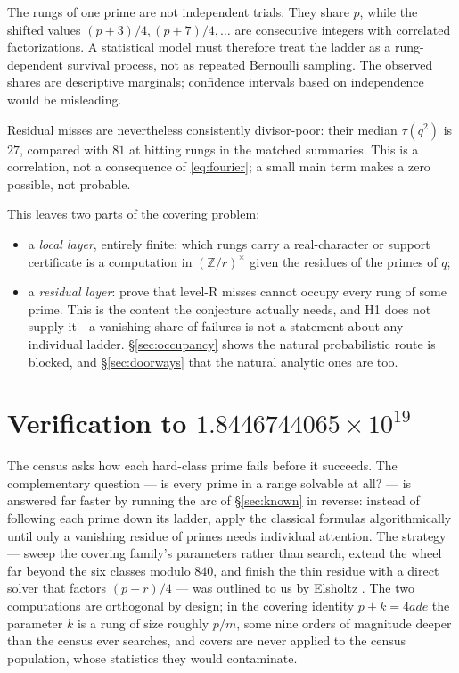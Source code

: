 \documentclass[11pt]{article}
\theoremstyle{definition}
\theoremstyle{remark}
\begin{document}
The rungs of one prime are not independent trials. They share $p$, while the shifted
values $(p+3)/4,(p+7)/4,\ldots$ are consecutive integers with correlated
factorizations. A statistical model must therefore treat the ladder as a
rung-dependent survival process, not as repeated Bernoulli sampling. The observed
shares are descriptive marginals; confidence intervals based on independence would be
misleading.

Residual misses are nevertheless consistently divisor-poor: their median
$\tau(q^2)$ is $27$, compared with $81$ at hitting rungs in the matched summaries. This
is a correlation, not a consequence of \eqref{eq:fourier}; a small main term makes a
zero possible, not probable.

This leaves two parts of the covering problem:

\begin{itemize}
\item a \emph{local layer}, entirely finite: which rungs carry a real-character or
support certificate is a computation in $(\mathbb{Z}/r)^\times$ given the residues of
the primes of $q$;
\item a \emph{residual layer}: prove that level-R misses cannot occupy every rung of
some prime. This is the content the conjecture actually needs, and H1 does not supply
it---a vanishing share of failures is not a statement about any individual ladder.
\S\ref{sec:occupancy} shows the natural probabilistic route is blocked, and
\S\ref{sec:doorways} that the natural analytic ones are too.
\end{itemize}

\fi

\section{Verification to \texorpdfstring{$1.8446744065\times10^{19}$}{1.8446744065e19}}\label{sec:record}

The census asks how each hard-class prime fails before it succeeds. The complementary
question --- is every prime in a range solvable at all? --- is answered far faster by
running the arc of \S\ref{sec:known} in reverse: instead of following each prime down
its ladder, apply the classical formulas algorithmically until only a vanishing residue of
primes needs individual attention. The strategy --- sweep the covering family's
parameters rather than search, extend the wheel far beyond the six classes modulo
$840$, and finish the thin residue with a direct solver that factors $(p+r)/4$ ---
was outlined to us by Elsholtz \cite{ElsholtzPC2026}. The two computations are
orthogonal by design; in the covering identity $p + k = 4ade$ the parameter $k$ is a
rung of size roughly $p/m$, some nine orders of magnitude deeper than the census ever
searches, and covers are never applied to the census population, whose statistics
they would contaminate.
\end{document}
